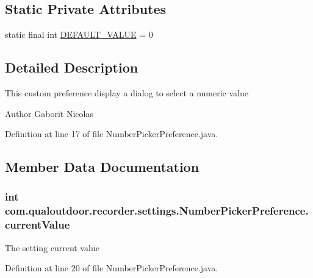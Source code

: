 \subsection*{Static Private Attributes}
\begin{DoxyCompactItemize}
\item 
static final int \hyperlink{classcom_1_1qualoutdoor_1_1recorder_1_1settings_1_1NumberPickerPreference_a5613d0ea5422ee2aea4f52ea535ef9cc}{D\-E\-F\-A\-U\-L\-T\-\_\-\-V\-A\-L\-U\-E} = 0
\end{DoxyCompactItemize}


\subsection{Detailed Description}
This custom preference display a dialog to select a numeric value

\begin{DoxyAuthor}{Author}
Gaborit Nicolas 
\end{DoxyAuthor}


Definition at line 17 of file Number\-Picker\-Preference.\-java.



\subsection{Member Data Documentation}
\hypertarget{classcom_1_1qualoutdoor_1_1recorder_1_1settings_1_1NumberPickerPreference_af4e26f16b60f91e13e00758da5ea5ecf}{
\subsubsection[{current\-Value}]{\setlength{\rightskip}{0pt plus 5cm}int com.\-qualoutdoor.\-recorder.\-settings.\-Number\-Picker\-Preference.\-current\-Value\hspace{0.3cm}{\ttfamily [private]}}}\label{classcom_1_1qualoutdoor_1_1recorder_1_1settings_1_1NumberPickerPreference_af4e26f16b60f91e13e00758da5ea5ecf}
The setting current value 

Definition at line 20 of file Number\-Picker\-Preference.\-java.

